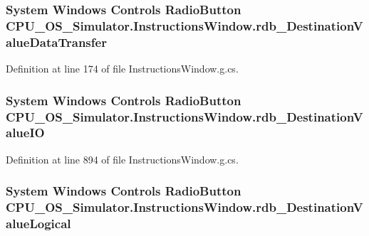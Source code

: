 \subsubsection[{rdb\+\_\+\+Destination\+Value\+Data\+Transfer}]{\setlength{\rightskip}{0pt plus 5cm}System Windows Controls Radio\+Button C\+P\+U\+\_\+\+O\+S\+\_\+\+Simulator.\+Instructions\+Window.\+rdb\+\_\+\+Destination\+Value\+Data\+Transfer\hspace{0.3cm}{\ttfamily [package]}}\label{class_c_p_u___o_s___simulator_1_1_instructions_window_a03ff2485a6554464a5c6c2b012dafd1a}


Definition at line 174 of file Instructions\+Window.\+g.\+cs.

\hypertarget{class_c_p_u___o_s___simulator_1_1_instructions_window_a012739d419d605946f5dc0fd645db182}{}
\subsubsection[{rdb\+\_\+\+Destination\+Value\+I\+O}]{\setlength{\rightskip}{0pt plus 5cm}System Windows Controls Radio\+Button C\+P\+U\+\_\+\+O\+S\+\_\+\+Simulator.\+Instructions\+Window.\+rdb\+\_\+\+Destination\+Value\+I\+O\hspace{0.3cm}{\ttfamily [package]}}\label{class_c_p_u___o_s___simulator_1_1_instructions_window_a012739d419d605946f5dc0fd645db182}


Definition at line 894 of file Instructions\+Window.\+g.\+cs.

\hypertarget{class_c_p_u___o_s___simulator_1_1_instructions_window_a73ba820a305842d3dea1ad79e6e87e6d}{}
\subsubsection[{rdb\+\_\+\+Destination\+Value\+Logical}]{\setlength{\rightskip}{0pt plus 5cm}System Windows Controls Radio\+Button C\+P\+U\+\_\+\+O\+S\+\_\+\+Simulator.\+Instructions\+Window.\+rdb\+\_\+\+Destination\+Value\+Logical\hspace{0.3cm}{\ttfamily [package]}}\label{class_c_p_u___o_s___simulator_1_1_instructions_window_a73ba820a305842d3dea1ad79e6e87e6d}


